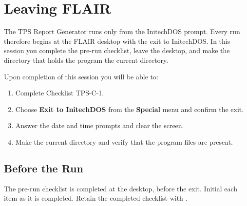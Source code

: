\chapter{Leaving FLAIR}

The TPS Report Generator runs only from the
InitechDOS prompt.  Every run therefore begins at the FLAIR desktop with the
exit to InitechDOS.  In this session you complete the pre-run checklist,
leave the desktop, and make the directory that holds the program the
current directory.

Upon completion of this session you will be able to:
\begin{enumerate}
\item Complete Checklist TPS-C-1.
\item Choose \textbf{Exit to InitechDOS} from the \textbf{Special} menu and
  confirm the exit.
\item Answer the date and time prompts and clear the screen.
\item Make  the current directory and verify that the
  program files are present.
\end{enumerate}

\IsThisGoodForTheCompany

\section{Before the Run}
The pre-run checklist is completed at the desktop, before the exit.  Initial
each item as it is completed.  Retain the completed checklist with
.

